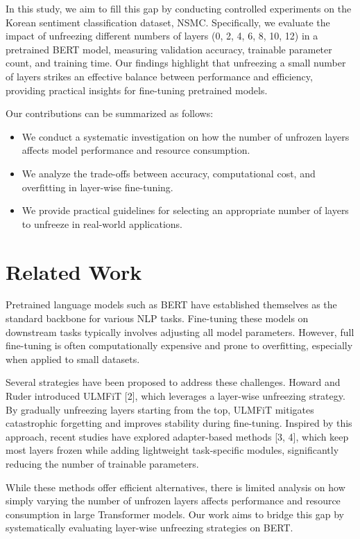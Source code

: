 \documentclass{article}
\begin{document}
In this study, we aim to fill this gap by conducting controlled experiments on the Korean sentiment classification dataset, NSMC. Specifically, we evaluate the impact of unfreezing different numbers of layers (0, 2, 4, 6, 8, 10, 12) in a pretrained BERT model, measuring validation accuracy, trainable parameter count, and training time. Our findings highlight that unfreezing a small number of layers strikes an effective balance between performance and efficiency, providing practical insights for fine-tuning pretrained models.

Our contributions can be summarized as follows:
\begin{itemize}
    \item We conduct a systematic investigation on how the number of unfrozen layers affects model performance and resource consumption.
    \item We analyze the trade-offs between accuracy, computational cost, and overfitting in layer-wise fine-tuning.
    \item We provide practical guidelines for selecting an appropriate number of layers to unfreeze in real-world applications.
\end{itemize}


\section{Related Work}

Pretrained language models such as BERT \cite{devlin2018bert} have established themselves as the standard backbone for various NLP tasks. Fine-tuning these models on downstream tasks typically involves adjusting all model parameters. However, full fine-tuning is often computationally expensive and prone to overfitting, especially when applied to small datasets.

Several strategies have been proposed to address these challenges. Howard and Ruder introduced ULMFiT [2], which leverages a layer-wise unfreezing strategy. By gradually unfreezing layers starting from the top, ULMFiT mitigates catastrophic forgetting and improves stability during fine-tuning. Inspired by this approach, recent studies have explored adapter-based methods [3, 4], which keep most layers frozen while adding lightweight task-specific modules, significantly reducing the number of trainable parameters.

While these methods offer efficient alternatives, there is limited analysis on how simply varying the number of unfrozen layers affects performance and resource consumption in large Transformer models. Our work aims to bridge this gap by systematically evaluating layer-wise unfreezing strategies on BERT.
\end{document}
